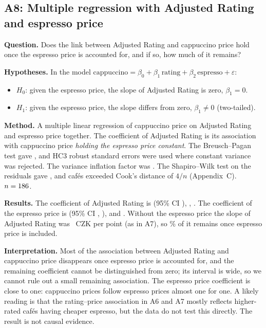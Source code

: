 \documentclass[11pt,a4paper]{article}
\begin{document}
\subsection{A8: Multiple regression with Adjusted Rating and espresso price}

\textbf{Question.} Does the link between Adjusted Rating and cappuccino price hold once the espresso price is accounted for, and if so, how much of it remains?

\textbf{Hypotheses.} In the model $\text{cappuccino} = \beta_0 + \beta_1\,\text{rating} + \beta_2\,\text{espresso} + \varepsilon$:
\begin{itemize}
  \item $H_0$: given the espresso price, the slope of Adjusted Rating is zero, $\beta_1 = 0$.
  \item $H_1$: given the espresso price, the slope differs from zero, $\beta_1 \neq 0$ (two-tailed).
\end{itemize}

\textbf{Method.} A multiple linear regression of cappuccino price on Adjusted Rating and espresso price together. The coefficient of Adjusted Rating is its association with cappuccino price \emph{holding the espresso price constant}. The Breusch--Pagan test gave \AEightBP{}, and HC3 robust standard errors were used where constant variance was rejected. The variance inflation factor was \AEightVIF{}. The Shapiro--Wilk test on the residuals gave \AEightSW{}, and \AEightCook{} caf\'es exceeded Cook's distance of $4/n$ (Appendix~C). $n = 186{}$.

\textbf{Results.} The coefficient of Adjusted Rating is \AEightEst{} (95\% CI \AEightCI{}), \AEightTest{}, \AEightP{}. The coefficient of the espresso price is \AEightEsp{} (95\% CI \AEightEspCI{}, \AEightEspP{}), and \AEightEff{}. Without the espresso price the slope of Adjusted Rating was \AEightSimple{}~CZK per point (as in A7), so \AEightRemain{}\% of it remains once espresso price is included.

\textbf{Interpretation.} Most of the association between Adjusted Rating and cappuccino price disappears once espresso price is accounted for, and the remaining coefficient cannot be distinguished from zero; its interval is wide, so we cannot rule out a small remaining association. The espresso price coefficient is close to one: cappuccino prices follow espresso prices almost one for one. A likely reading is that the rating--price association in A6 and A7 mostly reflects higher-rated caf\'es having cheaper espresso, but the data do not test this directly. The result is not causal evidence.
\end{document}
